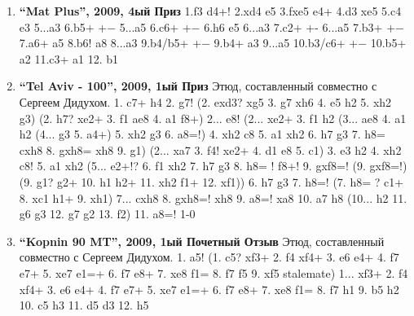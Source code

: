 \begin{enumerate}
\item \textbf{ ``Mat Plus'', 2009, 4ый Приз } 1.\knight{}f3 d4+! 2.\knight{}xd4 e5 3.fxe5 \rook{}e4+ 4.\king{}d3 \rook{}xe5 5.\king{}c4 \rook{}e3
  5...\king{}a3 6.\knight{}b5+ +−
  5...\king{}a5 6.\knight{}c6+ +−
6.\rook{}h6 \rook{}e5
  6...\king{}a3 7.\knight{}c2+ +-
  6...\king{}a5 7.\knight{}b3+ +−
7.\rook{}a6+ \rook{}a5 8.\rook{}b6! \rook{}a8 
  8...\king{}a3 9.\rook{}b4/\knight{}b5+ +−
9.\rook{}b4+ \king{}a3
  9...\king{}a5 10.\knight{}b3/\knight{}c6+ +−
10.\knight{}b5+ \king{}a2 11.\knight{}c3+ \king{}a1 12. \rook{}b1\mate{}

\item \textbf{ ``Tel Aviv - 100'', 2009, 1ый Приз } Этюд, составленный совместно с Сергеем Дидухом.
1. \bishop{}c7+ \king{}h4 2. g7! 
    (2. exd3? \king{}xg5 3. g7 \king{}xh6 4. \bishop{}e5 h2 5. \bishop{}xh2 g3)
    (2. h7? \rook{}xe2+ 3. \king{}f1 \rook{}ae8 4. \rook{}a1 \rook{}f8+) 
2... \rook{}e8! 
    (2... \rook{}xe2+ 3. \king{}f1 h2 
        (3... \rook{}ae8 4. \rook{}a1 h2 
             (4... g3 5. \rook{}a4+) 
        5. \bishop{}xh2 g3 6. a8=\queen{}!) 
    4. \bishop{}xh2 \rook{}c8 5. \rook{}a1 \rook{}xh2 6. h7 \king{}g3 7. h8=\queen{} \rook{}cxh8 8. gxh8=\queen{} \rook{}xh8 9. \king{}g1)
    (2... \rook{}xa7 3. \bishop{}f4! \rook{}xe2+ 4. \king{}d1 \rook{}e8 5. \king{}c1) 
3. e3 h2 4. \bishop{}xh2 \rook{}c8! 5. \rook{}a1 \rook{}xh2 
    (5... \rook{}e2+!? 6. \king{}f1 \rook{}xh2 7. h7 \king{}g3 8. h8=\rook{} ! \rook{}f8+! 9. gxf8=\bishop{}! 
        (9. gxf8=\knight{}!) 
        (9. \king{}g1? \rook{}g2+ 10. \king{}h1 \rook{}h2+ 11. \rook{}xh2 \rook{}f1+ 12. \rook{}xf1)) 
6. h7 \king{}g3 7. h8=\rook{}! 
    (7. h8=\queen{} ? \rook{}c1+ 8. \rook{}xc1 \rook{}h1+ 9. \queen{}xh1) 
7... \rook{}cxh8 8. gxh8=\rook{}! \rook{}xh8 9. a8=\bishop{}! \rook{}xa8 10. a7 \rook{}h8 
    (10... \king{}h2 11. g6 g3 12. g7 g2 13. \king{}f2) 
11. a8=\bishop{}! 1-0

\item \textbf{ ``Kopnin 90 MT'', 2009, 1ый Почетный Отзыв } Этюд, составленный совместно с Сергеем Дидухом.
 1. \rook{}a5! 
    (1. \rook{}c5? \rook{}xf3+ 2. \knight{}f4 \rook{}xf4+ 3. \king{}e6 \rook{}e4+ 4. \king{}f7 \rook{}e7+ 5. \king{}xe7 e1=\queen{}+ 6. \king{}f7 \queen{}e8+ 7. \king{}xe8 f1=\queen{} 8. \king{}f7 \queen{}f5 9. \rook{}xf5 {stalemate})
1... \rook{}xf3+ 2. \knight{}f4 \rook{}xf4+ 3. \king{}e6 \rook{}e4+ 4. \king{}f7 \rook{}e7+ 5. \king{}xe7 e1=\queen{}+ 6. \king{}f7 \queen{}e8+ 7. \king{}xe8 f1=\queen{} 8. \king{}f7 \queen{}h1 9. \rook{}b5 \queen{}h2 10. \rook{}c5 \queen{}h3 11. \rook{}d5 \queen{}d3 12. \rook{}h5\mate{}


\end{enumerate}
